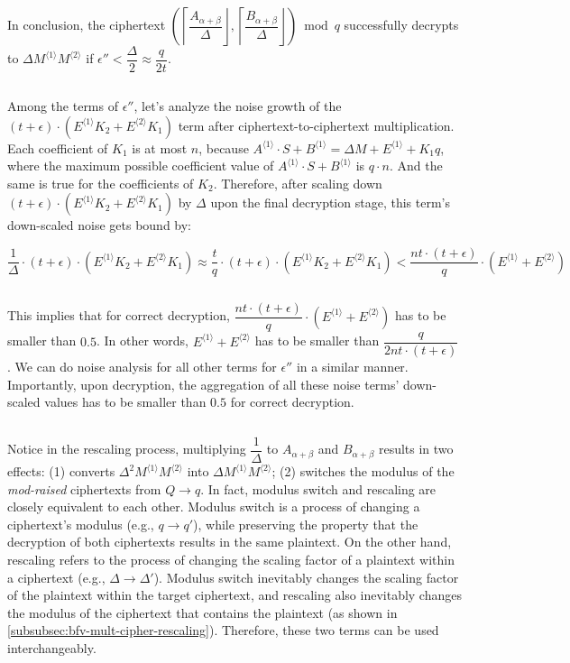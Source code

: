 $ $

In conclusion, the ciphertext $\left(\left\lceil\dfrac{A_{\alpha+\beta}}{\Delta}\right\rfloor, \left\lceil\dfrac{B_{\alpha+\beta}}{\Delta}\right\rfloor\right) \bmod q$ successfully decrypts to $\Delta M^{\langle 1 \rangle}M^{\langle 2 \rangle}$ if $\epsilon'' < \dfrac{\Delta}{2} \approx \dfrac{q}{2t}$. 

$ $

 Among the terms of $\epsilon''$, let's analyze the noise growth of the $(t + \epsilon)\cdot(E^{\langle 1 \rangle}K_2 + E^{\langle 2 \rangle}K_1)$ term after ciphertext-to-ciphertext multiplication. Each coefficient of $K_1$ is at most $n$, because $A^{\langle 1 \rangle}\cdot S + B^{\langle 1 \rangle} = \Delta M + E^{\langle 1 \rangle} + K_1q$, where the maximum possible coefficient value of $A^{\langle 1 \rangle}\cdot S + B^{\langle 1 \rangle}$ is $q\cdot n$. And the same is true for the coefficients of $K_2$. Therefore, after scaling down $(t + \epsilon)\cdot(E^{\langle 1 \rangle}K_2 + E^{\langle 2 \rangle}K_1)$ by $\Delta$ upon the final decryption stage, this term's down-scaled noise gets bound by: 

$\dfrac{1}{\Delta}\cdot(t + \epsilon)\cdot(E^{\langle 1 \rangle}K_2 + E^{\langle 2 \rangle}K_1) \approx \dfrac{t}{q}\cdot(t + \epsilon)\cdot(E^{\langle 1 \rangle}K_2 + E^{\langle 2 \rangle}K_1) < \dfrac{nt \cdot (t + \epsilon)}{q} \cdot (E^{\langle 1 \rangle} + E^{\langle 2 \rangle})$

$ $

This implies that for correct decryption, $\dfrac{nt \cdot (t + \epsilon)}{q} \cdot (E^{\langle 1 \rangle} + E^{\langle 2 \rangle})$ has to be smaller than $0.5$. In other words, $E^{\langle 1 \rangle} + E^{\langle 2 \rangle}$ has to be smaller than $\dfrac{q}{2nt \cdot (t + \epsilon)}$. We can do noise analysis for all other terms for $\epsilon''$ in a similar manner. Importantly, upon decryption, the aggregation of all these noise terms' down-scaled values has to be smaller than $0.5$ for correct decryption. 

$ $

Notice in the rescaling process, multiplying $\dfrac{1}{\Delta}$ to $A_{\alpha + \beta}$ and $B_{\alpha + \beta}$ results in two effects: (1) converts $\Delta^2 M^{\langle 1 \rangle} M^{\langle 2 \rangle}$ into $\Delta M^{\langle 1 \rangle}  M^{\langle 2 \rangle}$; (2) switches the modulus of the \textit{mod-raised} ciphertexts from $Q \rightarrow q$. 
In fact, modulus switch and rescaling are closely equivalent to each other. Modulus switch is a process of changing a ciphertext's modulus (e.g., $q \rightarrow q'$), while preserving the property that the decryption of both ciphertexts results in the same plaintext. On the other hand, rescaling refers to the process of changing the scaling factor of a plaintext within a ciphertext (e.g., $\Delta \rightarrow \Delta'$). Modulus switch inevitably changes the scaling factor of the plaintext within the target ciphertext, and rescaling also inevitably changes the modulus of the ciphertext that contains the plaintext (as shown in \autoref{subsubsec:bfv-mult-cipher-rescaling}). Therefore, these two terms can be used interchangeably. 


